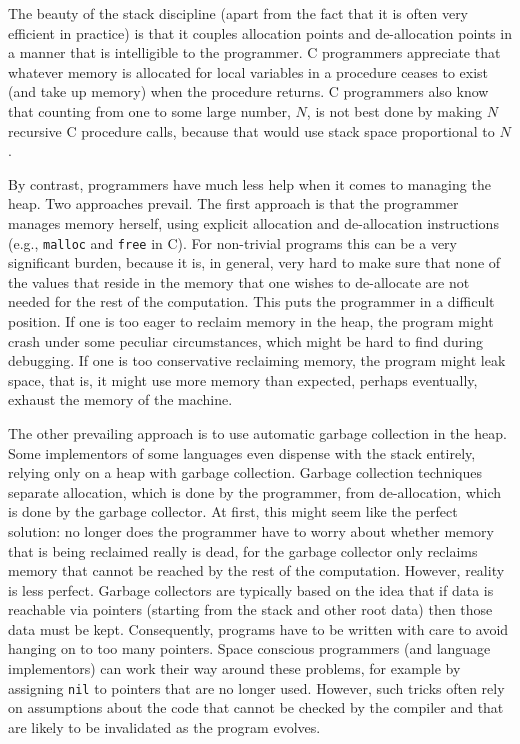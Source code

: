 \documentclass[12pt]{book}
\begin{document}
The beauty of the stack discipline (apart from the fact that it is
often very efficient in practice) is that it couples allocation points
and de-allocation points in a manner that is intelligible to the
programmer. C programmers appreciate that whatever memory is allocated
for local variables in a procedure ceases to exist (and take up
memory) when the procedure returns.
%
C programmers also know that counting from one to some large number,
$N$, is not best done by making $N$ recursive C procedure calls,
because that would use stack space proportional to $N$.

By contrast, programmers have much less help when it comes to managing
the heap.  Two approaches prevail. The first approach is that the
programmer manages memory herself, using explicit allocation and
de-allocation instructions (e.g., 
%
{\tt malloc} and 
%
{\tt free} in C). For non-trivial programs this can be a very
significant burden, because it is, in general, very hard to make sure
that none of the values that reside in the memory that one wishes to
de-allocate are not needed for the rest of the computation.  This puts
the programmer in a difficult position. If one is too eager to reclaim
memory in the heap, the program might crash under some peculiar
circumstances, which might be hard to find during debugging.  If one
is too conservative reclaiming memory, the program might leak space,
that is, it might use more memory than expected, perhaps eventually,
exhaust the memory of the machine.

The other prevailing approach is to use automatic garbage collection
in the heap.  Some implementors of some languages even dispense with
the stack entirely, relying only on a heap with garbage collection.
Garbage collection techniques separate allocation, which is done by
the programmer, from de-allocation, which is done by the garbage
collector.  At first, this might seem like the perfect solution: no
longer does the programmer have to worry about whether memory that is
being reclaimed really is dead, for the garbage collector only
reclaims memory that cannot be reached by the rest of the
computation. However, reality is less perfect. Garbage collectors are
typically based on the idea that if data is reachable via pointers
(starting from the stack and other root data) then those data must be
kept. Consequently, programs have to be written with care to avoid
hanging on to too many pointers. Space conscious programmers (and
language implementors) can work their way around these problems, for
example by assigning {\tt nil} to pointers that are no longer used.
However, such tricks often rely on assumptions about the code that
cannot be checked by the compiler and that are likely to be
invalidated as the program evolves.
\end{document}
